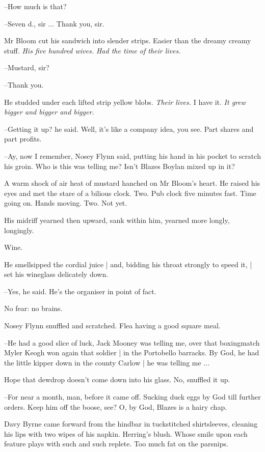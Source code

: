 --How much is that?

--Seven d., sir ...
Thank you, sir.

Mr Bloom cut his sandwich into slender strips.
Easier than the dreamy creamy stuff.
\emph{His five hundred wives.
Had the time of their lives.}

--Mustard, sir?

--Thank you.

He studded under each lifted strip yellow blobs.
\emph{Their lives.}
I have it.
\emph{It grew bigger and bigger and bigger.}

--Getting it up?
he said.
Well, it's like a company idea, you see.
Part shares and part profits.

--Ay, now I remember,
Nosey Flynn said,
putting his hand in his pocket to scratch his groin.
Who is this was telling me?
Isn't Blazes Boylan mixed up in it?

A warm shock of air heat of mustard hanched on Mr Bloom's heart.
He raised his eyes and met the stare of a bilious clock.
Two.
Pub clock five minutes fast.
Time going on.
Hands moving.
Two.
Not yet.

His midriff yearned then upward,
sank within him,
yearned more longly,
longingly.

Wine.

He smellsipped the cordial juice |
and, bidding his throat strongly to speed it, |
set his wineglass delicately down.

--Yes,
he said.
He's the organiser in point of fact.

No fear:
no brains.

Nosey Flynn snuffled and scratched.
Flea having a good square meal.

--He had a good slice of luck,
Jack Mooney was telling me,
over that boxingmatch Myler Keogh won again that soldier |
in the Portobello barracks.
By God,
he had the little kipper down in the county Carlow |
he was telling me ...

Hope that dewdrop doesn't come down into his glass.
No,
snuffled it up.

--For near a month, man,
before it came off.
Sucking duck eggs by God till further orders.
Keep him off the boose, see?
O, by God,
Blazes is a hairy chap.

Davy Byrne came forward from the hindbar in tuckstitched shirtsleeves,
cleaning his lips with two wipes of his napkin.
Herring's blush.
Whose smile upon each feature plays with such and such replete.
Too much fat on the parsnips.

